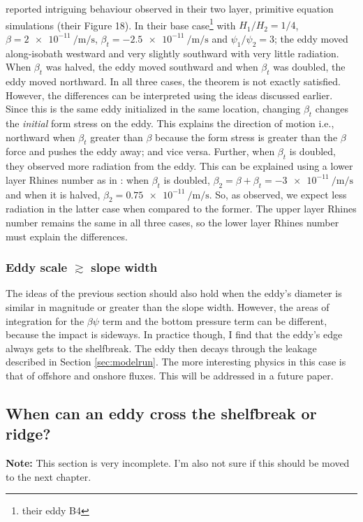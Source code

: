 \citet{Jacob2002} reported intriguing behaviour observed in their two layer, primitive equation simulations (their Figure 18). In their base case\footnote{their eddy B4} with $H_1/H_2 = 1/4$, $β = \SI{2e-11}{\per\metre\per\second}$, $β_t = \SI{-2.5e-11}{\per\metre\per\second}$ and $ψ_1/ψ_2 = 3$; the eddy moved along-isobath westward and very slightly southward with very little radiation. When $β_t$ was halved, the eddy moved southward and when $β_t$ was doubled, the eddy moved northward. In all three cases, the theorem is not exactly satisfied. However, the differences can be interpreted using the ideas discussed earlier. Since this is the same eddy initialized in the same location, changing $β_t$ changes the \emph{initial} form stress on the eddy. This explains the direction of motion i.e., northward when $β_t$ greater than $β$ because the form stress is greater than the $β$ force and pushes the eddy away; and vice versa. Further, when $β_t$ is doubled, they observed more radiation from the eddy. This can be explained using a lower layer Rhines number as in \cite{LaCasce1998}: when $β_t$ is doubled, $β_2 = β + β_t = \SI{-3e-11}{\per\metre\per\second}$ and when it is halved, $β_2 = \SI{0.75e-11}{\per\metre\per\second}$. So, as observed, we expect less radiation in the latter case when compared to the former. The upper layer Rhines number remains the same in all three cases, so the lower layer Rhines number must explain the differences.
\subsubsection*{Eddy scale $≳$ slope width}
\label{sec-5-1-3}
The ideas of the previous section should also hold when the eddy's diameter is similar in magnitude or greater than the slope width. However, the areas of integration for the $βψ$ term and the bottom pressure term can be different, because the impact is sideways. In practice though, I find that the eddy's edge always gets to the shelfbreak. The eddy then decays through the leakage described in Section \ref{sec:modelrun}. The more interesting physics in this case is that of offshore and onshore fluxes. This will be addressed in a future paper.
\subsection{When can an eddy cross the shelfbreak or ridge?}
\label{sec-5-2}
\label{sec:sb}
\textbf{Note:} This section is very incomplete. I'm also not sure if this should be moved to the next chapter.

